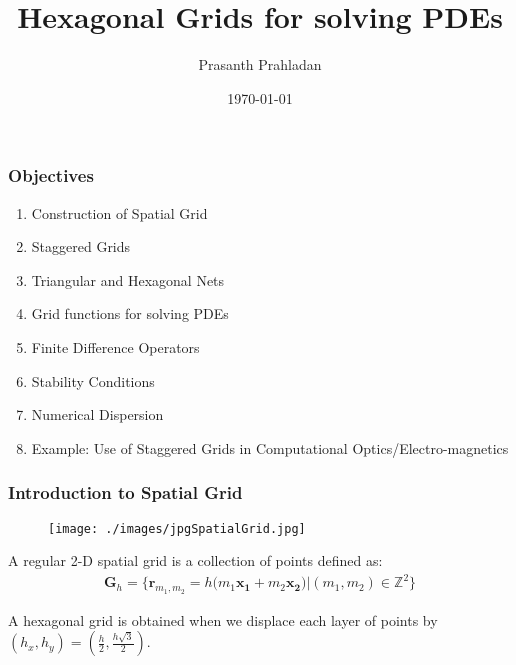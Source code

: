 \documentclass{beamer}
\title[APPM 7400: HW\#1]{Hexagonal Grids for solving PDEs} %
\author[Prasanth Prahladan]{Prasanth Prahladan} %
\institute[CU Boulder] %
{University of Colorado Boulder  \\ %
\medskip
}
\date{\today} %
\begin{document}
\scriptsize

\begin{frame}
\titlepage %
\end{frame}


\begin{frame}
\frametitle{Objectives}
\begin{enumerate}
\item Construction of Spatial Grid
\item Staggered Grids
\item Triangular and Hexagonal Nets
\item Grid functions for solving PDEs
\item Finite Difference Operators
\item Stability Conditions 
\item Numerical Dispersion
\item Example: Use of Staggered Grids in Computational Optics/Electro-magnetics
\end{enumerate}

\end{frame}


\begin{frame}
\frametitle{Introduction to Spatial Grid}
\begin{figure}
\texttt{[image: ./images/jpgSpatialGrid.jpg]}
\label{fig:spatialGrid}
\end{figure}

A regular 2-D spatial grid is a collection of points defined as:
\begin{align*}
\mathbf{G}_h = \bigg\{\mathbf{r}_{m_1, m_2} = h \big( m_1 \mathbf{x_1} + m_2 \mathbf{x_2} \big) | (m_1,m_2) \in \mathbb{Z}^2\bigg\}
\end{align*}

A hexagonal grid is obtained when we displace each layer of points by $(h_x, h_y) = (\frac{h}{2}, \frac{h\sqrt{3}}{2})$.
\end{frame}
\end{document}
